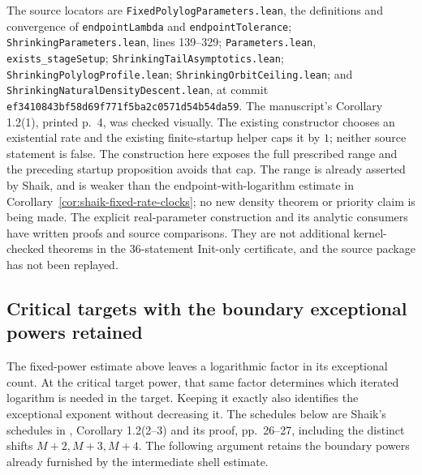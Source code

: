 \documentclass[11pt]{article}
\theoremstyle{remark}\newtheorem{remark}[proposition]{Remark}
\begin{document}
The source locators are \texttt{FixedPolylogParameters.lean}, the
definitions and convergence of \texttt{endpointLambda} and
\texttt{endpointTolerance};
\texttt{ShrinkingParameters.lean}, lines 139--329;
\texttt{Parameters.lean}, \texttt{exists\_stageSetup};
\texttt{ShrinkingTailAsymptotics.lean};
\texttt{ShrinkingPolylogProfile.lean};
\texttt{ShrinkingOrbitCeiling.lean}; and
\texttt{ShrinkingNaturalDensityDescent.lean}, at commit
\texttt{ef3410843bf58d69f771f5ba2c0571d54b54da59}.
The manuscript's Corollary 1.2(1), printed p.~4, was checked visually.
The existing constructor chooses an existential rate and the existing
finite-startup helper caps it by \(1\); neither source statement is
false. The construction here exposes the full prescribed range and the
preceding startup proposition avoids that cap.
The range is already asserted by Shaik, and is weaker than the
endpoint-with-logarithm estimate in
Corollary~\ref{cor:shaik-fixed-rate-clocks}; no new density theorem
or priority claim is being made. The explicit real-parameter construction
and its analytic consumers have written proofs and source comparisons.
They are not additional kernel-checked theorems in the 36-statement
Init-only certificate, and the source package has not been replayed.

\subsection{Critical targets with the boundary exceptional powers retained}
\label{subsec:shaik-critical-scales}
The fixed-power estimate above leaves a logarithmic factor in its exceptional
count. At the critical target power, that same factor determines which
iterated logarithm is needed in the target. Keeping it exactly also identifies
the exceptional exponent without decreasing it. The schedules below are
Shaik's schedules in \cite{Shaik2026v324}, Corollary 1.2(2--3) and its proof,
pp.~26--27, including the distinct shifts \(M+2,M+3,M+4\).
The following argument retains the boundary powers already furnished by
the intermediate shell estimate.
\end{document}
